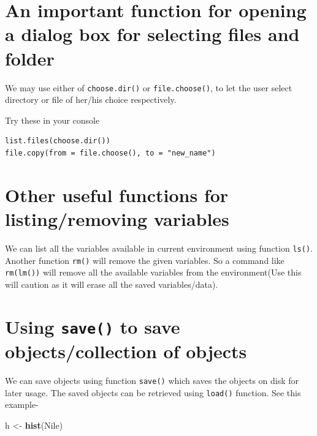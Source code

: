 \documentclass[
]{book}
\newenvironment{Shaded}{\begin{snugshade}}{\end{snugshade}}
\newcommand{\FunctionTok}[1]{\textcolor[rgb]{0.13,0.29,0.53}{\textbf{#1}}}
\newcommand{\NormalTok}[1]{#1}
\newcommand{\OtherTok}[1]{\textcolor[rgb]{0.56,0.35,0.01}{#1}}
\begin{document}
\hypertarget{an-important-function-for-opening-a-dialog-box-for-selecting-files-and-folder}{%
\section{An important function for opening a dialog box for selecting files and folder}\label{an-important-function-for-opening-a-dialog-box-for-selecting-files-and-folder}}

We may use either of \texttt{choose.dir()} or \texttt{file.choose()}, to let the user select directory or file of her/his choice respectively.

Try these in your console

\begin{verbatim}
list.files(choose.dir())
file.copy(from = file.choose(), to = "new_name")
\end{verbatim}

\hypertarget{other-useful-functions-for-listingremoving-variables}{%
\section{Other useful functions for listing/removing variables}\label{other-useful-functions-for-listingremoving-variables}}

We can list all the variables available in current environment using function \texttt{ls()}. Another function \texttt{rm()} will remove the given variables. So a command like \texttt{rm(lm())} will remove all the available variables from the environment(Use this will caution as it will erase all the saved variables/data).

\hypertarget{using-save-to-save-objectscollection-of-objects}{%
\section{\texorpdfstring{Using \texttt{save()} to save objects/collection of objects}{Using save() to save objects/collection of objects}}\label{using-save-to-save-objectscollection-of-objects}}

We can save objects using function \texttt{save()} which saves the objects on disk for later usage. The saved objects can be retrieved using \texttt{load()} function. See this example-

\begin{Shaded}
\begin{Highlighting}[]
\NormalTok{h }\OtherTok{\textless{}{-}} \FunctionTok{hist}\NormalTok{(Nile)}
\end{Highlighting}
\end{Shaded}
\end{document}
